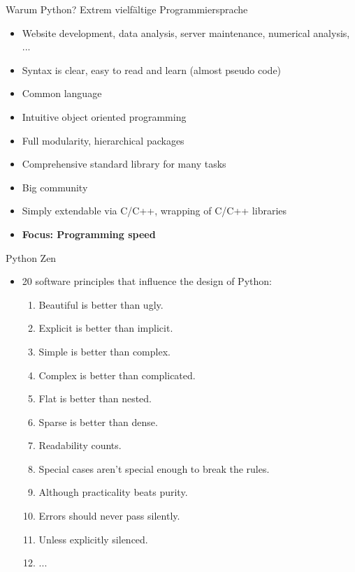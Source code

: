 \documentclass[xcolor=dvipsnames,aspectratio=169]{beamer}
\begin{document}
\begin{frame}{Warum Python?}
Extrem vielfältige Programmiersprache
\begin{itemize}
	\item Website development, data analysis, server maintenance, numerical analysis, ...
	\item Syntax is clear, easy to read and learn (almost pseudo code)
	\item Common language
	\item Intuitive object oriented programming
	\item Full modularity, hierarchical packages
	\item Comprehensive standard library for many tasks
	\item Big community
	\item Simply extendable via C/C++, wrapping of C/C++ libraries
	\item \textbf{Focus: Programming speed}
\end{itemize}
\end{frame}

\begin{frame}{Python Zen}
\begin{itemize}
	\item 20 software principles that influence the design of Python:
	\begin{enumerate}
		\item Beautiful is better than ugly.
		\item Explicit is better than implicit.
		\item Simple is better than complex.
		\item Complex is better than complicated.
		\item Flat is better than nested.
		\item Sparse is better than dense.
		\item Readability counts.
		\item Special cases aren’t special enough to break the rules.
		\item Although practicality beats purity.
		\item Errors should never pass silently.
		\item Unless explicitly silenced.
		\item ...
	\end{enumerate}
\end{itemize}
\end{frame}
\end{document}
